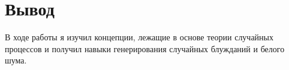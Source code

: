 \chapter{Вывод}
\label{ch:сhap5}

В ходе работы я изучил концепции, лежащие в основе теории случайных процессов и получил навыки генерирования случайных
блужданий и белого шума.

\endinput
